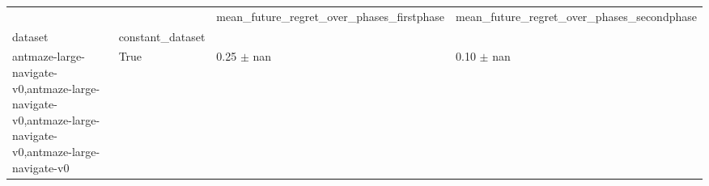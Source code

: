 \begin{tabular}{llll}
\toprule
 &  & mean_future_regret_over_phases_firstphase & mean_future_regret_over_phases_secondphase \\
dataset & constant_dataset &  &  \\
\midrule
antmaze-large-navigate-v0,antmaze-large-navigate-v0,antmaze-large-navigate-v0,antmaze-large-navigate-v0 & True & 0.25 $\pm$ nan & 0.10 $\pm$ nan \\
\cline{1-4}
\bottomrule
\end{tabular}
